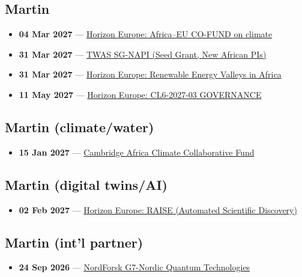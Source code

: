 \subsection*{Martin}
\begin{itemize}[leftmargin=1.4em,itemsep=0.1em]
  \item \textbf{04 Mar 2027} --- \href{https://www.africaeuropeinnovation.net/fr/opportunites-de-financement/}{Horizon Europe: Africa--EU CO-FUND on climate}
  \item \textbf{31 Mar 2027} --- \href{https://twas.org/opportunity/seed-grant-new-african-principal-investigators-sg-napi}{TWAS SG-NAPI (Seed Grant, New African PIs)}
  \item \textbf{31 Mar 2027} --- \href{https://www.africaeuropeinnovation.net/fr/opportunites-de-financement/}{Horizon Europe: Renewable Energy Valleys in Africa}
  \item \textbf{11 May 2027} --- \href{https://ogr.knust.edu.gh/funding/horizon-cl6-2027-03-governance-innovative-governance-environmental-observations-and-digital}{Horizon Europe: CL6-2027-03 GOVERNANCE}
\end{itemize}

\subsection*{Martin (climate/water)}
\begin{itemize}[leftmargin=1.4em,itemsep=0.1em]
  \item \textbf{15 Jan 2027} --- \href{https://www.cambridge-africa.cam.ac.uk/initiatives/2026-call-for-applications/}{Cambridge Africa Climate Collaborative Fund}
\end{itemize}

\subsection*{Martin (digital twins/AI)}
\begin{itemize}[leftmargin=1.4em,itemsep=0.1em]
  \item \textbf{02 Feb 2027} --- \href{https://topictree.ideal-ist.eu/topic/6992}{Horizon Europe: RAISE (Automated Scientific Discovery)}
\end{itemize}

\subsection*{Martin (int'l partner)}
\begin{itemize}[leftmargin=1.4em,itemsep=0.1em]
  \item \textbf{24 Sep 2026} --- \href{https://www2.fundsforngos.org/science/applications-open-for-quantum-technologies-funding-program/}{NordForsk G7-Nordic Quantum Technologies}
\end{itemize}

